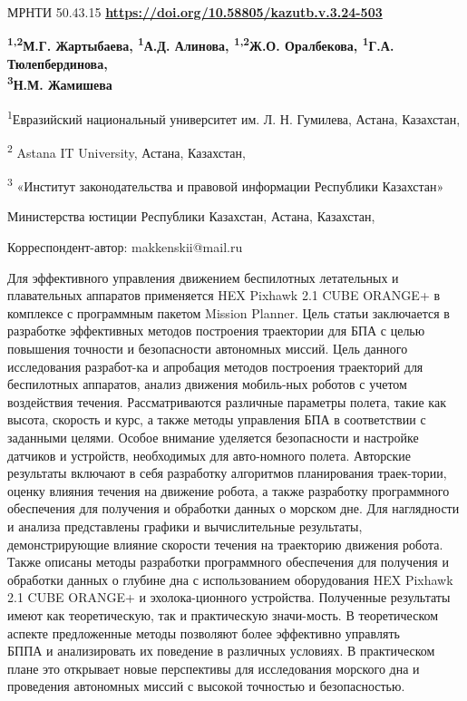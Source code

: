 \newpage
МРНТИ 50.43.15
\hfill {\bfseries \href{https://doi.org/10.58805/kazutb.v.3.24-503}{https://doi.org/10.58805/kazutb.v.3.24-503}}


\begin{center}
{\bfseries \textsuperscript{1,2}М.Г. Жартыбаева\envelope,
\textsuperscript{1}А.Д. Алинова, \textsuperscript{1,2}Ж.О. Оралбекова,
\textsuperscript{1}Г.А. Тюлепбердинова,\\
\textsuperscript{3}Н.М. Жамишева}

\textsuperscript{1}Евразийский национальный университет им. Л. Н.
Гумилева, Астана, Казахстан,

\textsuperscript{2} Astana IT University, Астана, Казахстан,

\textsuperscript{3} «Институт законодательства и правовой информации
Республики Казахстан»

Министерства юстиции Республики Казахстан, Астана, Казахстан,

\end{center}
\envelope Корреспондент-автор: makkenskii@mail.ru \vspace{0.5cm}

Для эффективного управления движением беспилотных летательных и
плавательных аппаратов применяется HEX Pixhawk 2.1 CUBE ORANGE+ в
комплексе с программным пакетом Mission Planner. Цель статьи заключается
в разработке эффективных методов построения траектории для БПА с целью
повышения точности и безопасности автономных миссий. Цель данного
исследования разработ-ка и апробация методов построения траекторий для
беспилотных аппаратов, анализ движения мобиль-ных роботов с учетом
воздействия течения. Рассматриваются различные параметры полета, такие
как высота, скорость и курс, а также методы управления БПА в
соответствии с заданными целями. Особое внимание уделяется безопасности
и настройке датчиков и устройств, необходимых для авто-номного полета.
Авторские результаты включают в себя разработку алгоритмов планирования
траек-тории, оценку влияния течения на движение робота, а также
разработку программного обеспечения для получения и обработки данных о
морском дне. Для наглядности и анализа представлены графики и
вычислительные результаты, демонстрирующие влияние скорости течения на
траекторию движения робота. Также описаны методы разработки программного
обеспечения для получения и обработки данных о глубине дна с
использованием оборудования HEX Pixhawk 2.1 CUBE ORANGE+ и
эхолока-ционного устройства. Полученные результаты имеют как
теоретическую, так и практическую значи-мость. В теоретическом аспекте
предложенные методы позволяют более эффективно управлять\\БППА и
анализировать их поведение в различных условиях. В практическом плане
это открывает новые перспективы для исследования морского дна и
проведения автономных миссий с высокой точностью и безопасностью.

